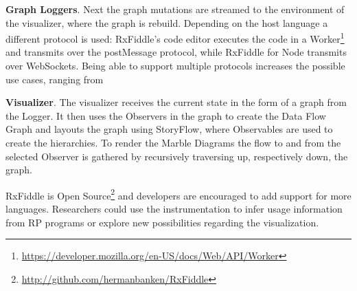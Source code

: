 \textbf{Graph Loggers}. Next the graph mutations are streamed to the environment of the visualizer, where the graph is rebuild. Depending on the host language a different protocol is used: RxFiddle's code editor executes the code in a Worker\footnote{\url{https://developer.mozilla.org/en-US/docs/Web/API/Worker}} and transmits over the postMessage protocol, while RxFiddle for Node transmits over WebSockets. Being able to support multiple protocols increases the possible use cases, ranging from 

\textbf{Visualizer}. The visualizer receives the current state in the form of a graph from the Logger. It then uses the Observers in the graph to create the Data Flow Graph and layouts the graph using StoryFlow, where Observables are used to create the hierarchies. To render the Marble Diagrams the flow to and from the selected Observer is gathered by recursively traversing up, respectively down, the graph.

RxFiddle is Open Source\footnote{\url{http://github.com/hermanbanken/RxFiddle}} and developers are encouraged to add support for more languages. Researchers could use the instrumentation to infer usage information from RP programs or explore new possibilities regarding the visualization.

